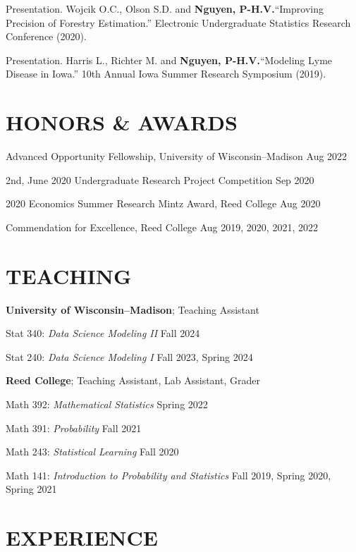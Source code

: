 \documentclass[margin]{res}
\def\pvn{\textbf{Nguyen, P-H.V.}}
\begin{document}
\begin{resume}
Presentation. Wojcik O.C., Olson S.D. and \pvn ``Improving Precision of Forestry Estimation.” Electronic Undergraduate Statistics Research Conference (2020).

Presentation. Harris L., Richter M. and \pvn ``Modeling Lyme Disease in Iowa.” 10th Annual Iowa Summer Research Symposium (2019).


\section{HONORS \& AWARDS} 

Advanced Opportunity Fellowship, University of Wisconsin--Madison \hfill Aug 2022

2nd, June 2020 Undergraduate Research Project Competition \hfill Sep 2020

2020 Economics Summer Research Mintz Award, Reed College \hfill Aug 2020

Commendation for Excellence, Reed College \hfill Aug 2019, 2020, 2021, 2022

\section{TEACHING}

\textbf{University of Wisconsin--Madison}; Teaching Assistant

Stat 340: {\it Data Science Modeling II} \hfill Fall 2024

Stat 240: {\it Data Science Modeling I} \hfill Fall 2023, Spring 2024

\textbf{Reed College}; Teaching Assistant, Lab Assistant, Grader 

Math 392: {\it Mathematical Statistics} \hfill Spring 2022

Math 391: {\it Probability} \hfill Fall 2021

Math 243: {\it Statistical Learning} \hfill Fall 2020

Math 141: {\it Introduction to Probability and Statistics} \hfill Fall 2019, Spring 2020, Spring 2021


\section{EXPERIENCE}


\end{resume}
\end{document}
